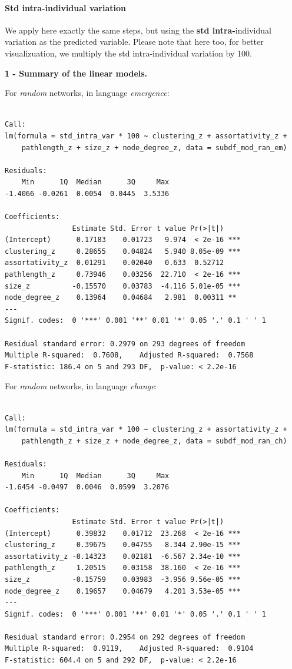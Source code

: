\documentclass[
]{article}
\begin{document}
\hypertarget{std-intra-individual-variation}{%
\paragraph{Std intra-individual
variation}\label{std-intra-individual-variation}}

We apply here exactly the same steps, but using the \textbf{std
intra-}individual variation as the predicted variable. Please note that
here too, for better visualizuation, we multiply the std
intra-individual variation by 100.

\textbf{1 - Summary of the linear models.}

For \emph{random} networks, in language \emph{emergence}:

\begin{verbatim}

Call:
lm(formula = std_intra_var * 100 ~ clustering_z + assortativity_z + 
    pathlength_z + size_z + node_degree_z, data = subdf_mod_ran_em)

Residuals:
    Min      1Q  Median      3Q     Max 
-1.4066 -0.0261  0.0054  0.0445  3.5336 

Coefficients:
                Estimate Std. Error t value Pr(>|t|)    
(Intercept)      0.17183    0.01723   9.974  < 2e-16 ***
clustering_z     0.28655    0.04824   5.940 8.05e-09 ***
assortativity_z  0.01291    0.02040   0.633  0.52712    
pathlength_z     0.73946    0.03256  22.710  < 2e-16 ***
size_z          -0.15570    0.03783  -4.116 5.01e-05 ***
node_degree_z    0.13964    0.04684   2.981  0.00311 ** 
---
Signif. codes:  0 '***' 0.001 '**' 0.01 '*' 0.05 '.' 0.1 ' ' 1

Residual standard error: 0.2979 on 293 degrees of freedom
Multiple R-squared:  0.7608,    Adjusted R-squared:  0.7568 
F-statistic: 186.4 on 5 and 293 DF,  p-value: < 2.2e-16
\end{verbatim}

For \emph{random} networks, in language \emph{change}:

\begin{verbatim}

Call:
lm(formula = std_intra_var * 100 ~ clustering_z + assortativity_z + 
    pathlength_z + size_z + node_degree_z, data = subdf_mod_ran_ch)

Residuals:
    Min      1Q  Median      3Q     Max 
-1.6454 -0.0497  0.0046  0.0599  3.2076 

Coefficients:
                Estimate Std. Error t value Pr(>|t|)    
(Intercept)      0.39832    0.01712  23.268  < 2e-16 ***
clustering_z     0.39675    0.04755   8.344 2.90e-15 ***
assortativity_z -0.14323    0.02181  -6.567 2.34e-10 ***
pathlength_z     1.20515    0.03158  38.160  < 2e-16 ***
size_z          -0.15759    0.03983  -3.956 9.56e-05 ***
node_degree_z    0.19657    0.04679   4.201 3.53e-05 ***
---
Signif. codes:  0 '***' 0.001 '**' 0.01 '*' 0.05 '.' 0.1 ' ' 1

Residual standard error: 0.2954 on 292 degrees of freedom
Multiple R-squared:  0.9119,    Adjusted R-squared:  0.9104 
F-statistic: 604.4 on 5 and 292 DF,  p-value: < 2.2e-16
\end{verbatim}
\end{document}
